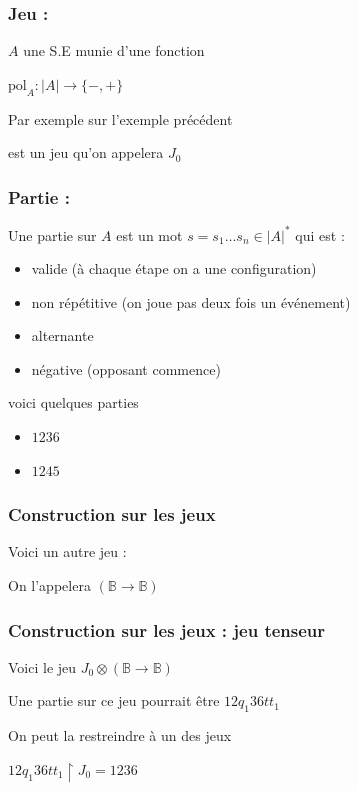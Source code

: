 \documentclass{beamer}
\begin{document}
\begin{frame}
\frametitle{Jeu :}

$A$ une S.E munie d'une fonction

$\text{pol}_A : |A| \rightarrow \{-, +\}$
\pause

Par exemple sur l'exemple précédent


est un jeu qu'on appelera $J_0$
\end{frame}

\begin{frame}
\frametitle{Partie :}

Une partie sur $A$ est un mot $s = s_1 \dots s_n \in |A|^*$ qui est :
\begin{itemize}
\item valide (à chaque étape on a une configuration)

\item non répétitive (on joue pas deux fois un événement)

\item alternante

\item négative (opposant commence)
\end{itemize}
\pause


voici quelques parties
\begin{itemize}
\item $1236$
\pause
\item $1245$
\end{itemize}
\end{frame}

\begin{frame}
\frametitle{Construction sur les jeux}

Voici un autre jeu :

On l'appelera $(\mathbb{B} \rightarrow \mathbb{B})$


\end{frame}

\begin{frame}
\frametitle{Construction sur les jeux : jeu tenseur}

Voici le jeu $J_0 \otimes (\mathbb{B} \rightarrow \mathbb{B})$

 
\pause

Une partie sur ce jeu pourrait être $1 2 q_1 3 6 tt_1$

On peut la restreindre à un des jeux

$1 2 q_1 3 6 tt_1 \upharpoonright J_0 = 1 2 3 6$
\end{frame}
\end{document}
